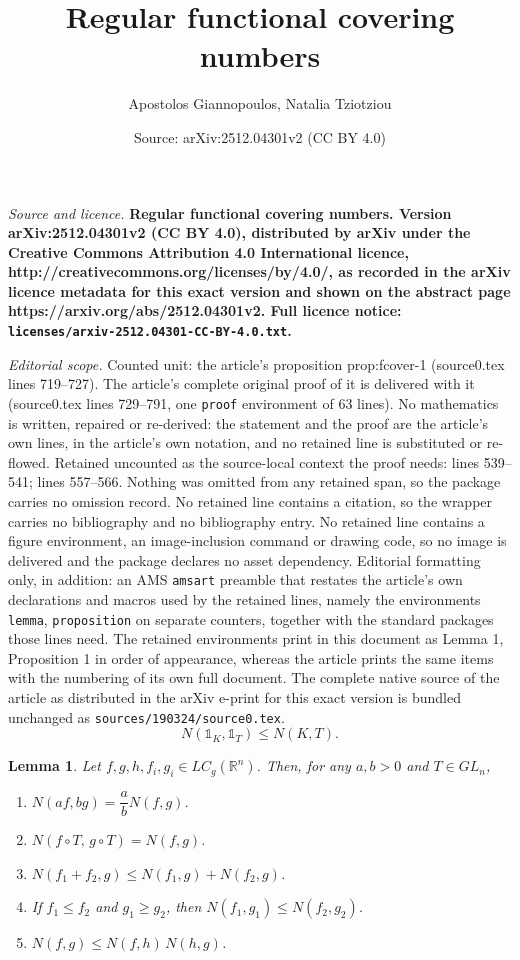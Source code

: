 \documentclass[10pt,a4paper]{amsart}
\title{\bf Regular functional covering numbers}
\author{Apostolos Giannopoulos, Natalia Tziotziou}
\date{Source: arXiv:2512.04301v2 (CC BY 4.0)}
\newtheorem{lemma}{Lemma}
\newcommand{\gr}{\geqslant}
\newcommand{\ls}{\leqslant}
\begin{document}
\maketitle

\noindent\emph{Source and licence.} \bf Regular functional covering numbers. Version arXiv:2512.04301v2 (CC BY 4.0), distributed by arXiv under the Creative Commons Attribution 4.0 International licence, http://creativecommons.org/licenses/by/4.0/, as recorded in the arXiv licence metadata for this exact version and shown on the abstract page https://arxiv.org/abs/2512.04301v2. Full licence notice: \texttt{licenses/arxiv-2512.04301-CC-BY-4.0.txt}.\par\smallskip

\noindent\textit{Editorial scope.} Counted unit: the article's proposition prop:fcover-1 (source0.tex lines 719--727). The article's complete original proof of it is delivered with it (source0.tex lines 729--791, one \texttt{proof} environment of 63 lines). No mathematics is written, repaired or re-derived: the statement and the proof are the article's own lines, in the article's own notation, and no retained line is substituted or re-flowed.  Retained uncounted as the source-local context the proof needs: lines 539--541; lines 557--566.  Nothing was omitted from any retained span, so the package carries no omission record.  No retained line contains a citation, so the wrapper carries no bibliography and no bibliography entry.  No retained line contains a figure environment, an image-inclusion command or drawing code, so no image is delivered and the package declares no asset dependency.  Editorial formatting only, in addition: an AMS \texttt{amsart} preamble that restates the article's own declarations and macros used by the retained lines, namely the environments \texttt{lemma}, \texttt{proposition} on separate counters, together with the standard packages those lines need.  The retained environments print in this document as Lemma 1, Proposition 1 in order of appearance, whereas the article prints the same items with the numbering of its own full document.  The complete native source of the article as distributed in the arXiv e-print for this exact version is bundled unchanged as \texttt{sources/190324/source0.tex}.
\begin{equation} \label{eq:indicator-covering}
N(\mathds{1}_K,\mathds{1}_T) \ls N(K,T).
\end{equation}

\begin{lemma}\label{lem:properties}
Let $f,g,h,f_i,g_i \in LC_g(\mathbb{R}^n)$. Then, for any $a,b>0$ and $T\in GL_n$,
\begin{enumerate}
\item[{\rm (i)}] $N(af,bg)=\dfrac{a}{b}N(f,g)$.
\item[{\rm (ii)}] $N(f\circ T,\, g\circ T)=N(f,g)$.
\item[{\rm (iii)}] $N(f_1+f_2,g)\ls N(f_1,g)+N(f_2,g)$.
\item[{\rm (iv)}] If $f_1 \ls f_2$ and $g_1 \gr g_2$, then $N(f_1,g_1)\ls N(f_2,g_2)$.
\item[{\rm (v)}] $N(f,g)\ls N(f,h)\,N(h,g)$.
\end{enumerate}
\end{lemma}
\end{document}
